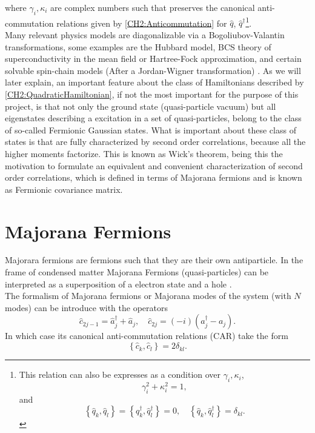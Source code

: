where $\gamma_i , \kappa_i$ are complex numbers such that preserves the canonical anti-commutation relations given by \eqref{CH2:Anticommutation} for $\hat{q}$, $\hat{q}^{\dagger}$\footnote{This relation can also be expresses as a condition over $\gamma_i , \kappa_i$,
\[ \gamma_i ^2+ \kappa_i^2 = 1,\]
and 
\[\left\{\hat{q}_{k}, \hat{q}_{l}\right\}=\left\{\hat{q}_{k}^{\dagger}, \hat{q}_{l}^{\dagger}\right\}=0, \quad\left\{\hat{q}_{k}, \hat{q}_{l}^{\dagger}\right\}=\delta_{k l}.\]
 }.
\\
Many relevant physics models are diagonalizable via a Bogoliubov-Valantin transformations, some examples are the Hubbard model, BCS theory of superconductivity in the mean field or Hartree-Fock approximation, and certain solvable spin-chain models (After a Jordan-Wigner transformation) \cite{fradkin_field_1997}. As we will later explain, an important feature about the class of Hamiltonians described by \eqref{CH2:QuadraticHamiltonian}, if not the most important for the purpose of this project,  is that not only the ground state (quasi-particle vacuum)  but all eigenstates describing a excitation  in a set of quasi-particles, belong to the class of so-called Fermionic Gaussian states\cite{botero_bcs-like_2004}. What is important about these class of states is that are fully characterized by second order correlations, because all the higher moments factorize. This is known as Wick's theorem\cite{bravyi_classical_2005, molinari_notes_2017}, being this the motivation to formulate an equivalent and convenient characterization of second order correlations, which is defined in terms of Majorana fermions and is known as Fermionic covariance matrix.
\section*{Majorana Fermions}
Majorara fermions are fermions such that they are their own antiparticle. In the frame of condensed matter Majorana Fermions (quasi-particles) can be interpreted as a superposition of a electron state and a hole \cite{leijnse_introduction_2012}.
\\
The formalism of Majorana fermions or Majorana modes of the system (with $N$ modes) can be introduce with the operators
\begin{equation}
\hat{c}_{2j-1}=\hat{a}_{j}^{\dagger}+\hat{a}_{j}, \quad \hat{c}_{2j}=(-i)\left(a_{j}^{\dagger}-a_{j}\right).
\label{CH2:majorana}
\end{equation}
In which case its canonical anti-commutation relations (CAR) take the form
\begin{equation}
\left\{\hat{c}_{k},\hat{c}_{l}\right\}=2 \delta_{k l}.
\label{CH2:CAR_majorana}
\end{equation}

